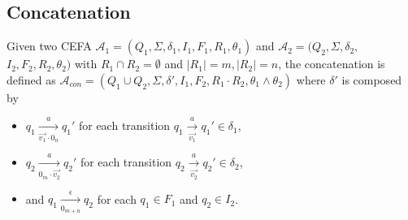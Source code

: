 \documentclass[runningheads]{llncs}
\newcommand*{\myvec}[1]{\vec{#1}}
\newcommand*{\aut}{\mathcal{A}}
\begin{document}
\subsection{Concatenation}\label{subsec:con}
Given two CEFA $\aut_1 = (Q_1, \Sigma, \delta_1, I_1, F_1, R_1, \theta_1)$ and $\aut_2 = (Q_2, \Sigma, \delta_2,$ $I_2, F_2, R_2, \theta_2)$ with $R_1\cap R_2= \emptyset$ and $|R_1|=m,|R_2|=n$, the concatenation is defined as $\aut_{con}=(Q_1\cup Q_2, \Sigma, \delta', I_1, F_2, R_1\cdot R_2, \theta_1\wedge\theta_2)$ where $\delta'$ is composed by
\begin{itemize}
  \item $q_1\xrightarrow[\myvec{v_1}\cdot 0_n]{a} q_1'$ for each transition $q_1\xrightarrow[\myvec{v_1}]{a} q_1' \in \delta_1$,
  \item $q_2\xrightarrow[0_m\cdot\myvec{v_2}]{a} q_2'$ for each transition $q_2\xrightarrow[\myvec{v_2}]{a} q_2' \in \delta_2$,
  \item and $q_1\xrightarrow[0_{m+n}]{\epsilon} q_2$ for each $q_1\in F_1$ and $q_2 \in I_2$.
\end{itemize}
\end{document}
